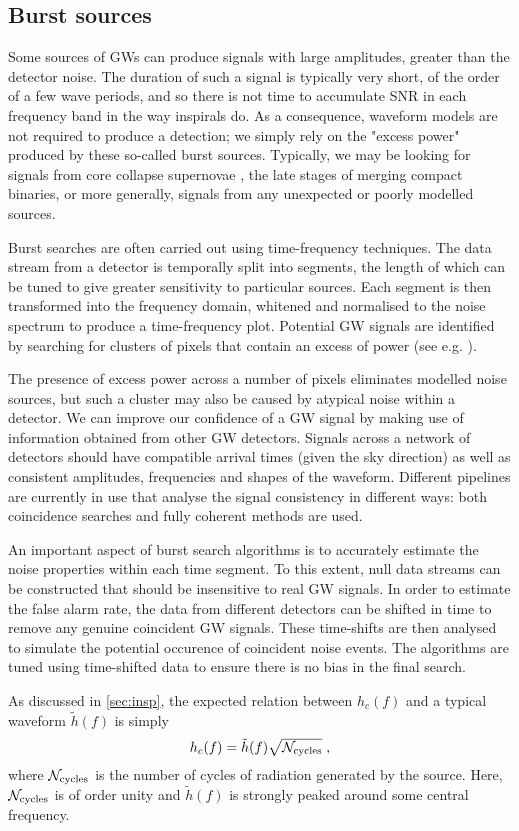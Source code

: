 \subsection{Burst sources}\label{sec:bursts}

Some sources of GWs can produce signals with large amplitudes, greater than the detector noise. The duration of such a signal is typically very short, of the order of a few wave periods, and so there is not time to accumulate SNR in each frequency band in the way inspirals do. As a consequence, waveform models are not required to produce a detection; we simply rely on the "excess power" produced by these so-called burst sources. Typically, we may be looking for signals from core collapse supernovae \citep{Ott2009}, the late stages of merging compact binaries, or more generally, signals from any unexpected or poorly modelled sources.

Burst searches are often carried out using time-frequency techniques. The data stream from a detector is temporally split into segments, the length of which can be tuned to give greater sensitivity to particular sources. Each segment is then transformed into the frequency domain, whitened and normalised to the noise spectrum to produce a time-frequency plot. Potential GW signals are identified by searching for clusters of pixels that contain an excess of power (see e.g. \cite{Bursts}).

The presence of excess power across a number of pixels eliminates modelled noise sources, but such a cluster may also be caused by atypical noise within a detector. We can improve our confidence of a GW signal by making use of information obtained from other GW detectors. Signals across a network of detectors should have compatible arrival times (given the sky direction) as well as consistent amplitudes, frequencies and shapes of the waveform. Different pipelines are currently in use that analyse the signal consistency in different ways: both coincidence searches \citep{Chatterji2004} and fully coherent methods \citep{Klimenko2008} are used.

An important aspect of burst search algorithms is to accurately estimate the noise properties within each time segment. To this extent, null data streams can be constructed that should be insensitive to real GW signals. In order to estimate the false alarm rate, the data from different detectors can be shifted in time to remove any genuine coincident GW signals. These time-shifts are then analysed to simulate the potential occurence of coincident noise events. The algorithms are tuned using time-shifted data to ensure there is no bias in the final search.

As discussed in \ref{sec:insp}, the expected relation between $h_{c}(f)$ and a typical waveform $\tilde{h}(f)$ is simply
\begin{equation}\label{eq:simple} h_{c}(f)=\tilde{h}(f)\sqrt{{\cal{N}}_{\textrm{cycles}}} \; , \end{equation}
where ${\cal{N}}_{\textrm{cycles}}$ is the number of cycles of radiation generated by the source. Here, ${\cal{N}}_{\textrm{cycles}}$ is of order unity and $\tilde{h}(f)$ is strongly peaked around some central frequency.


